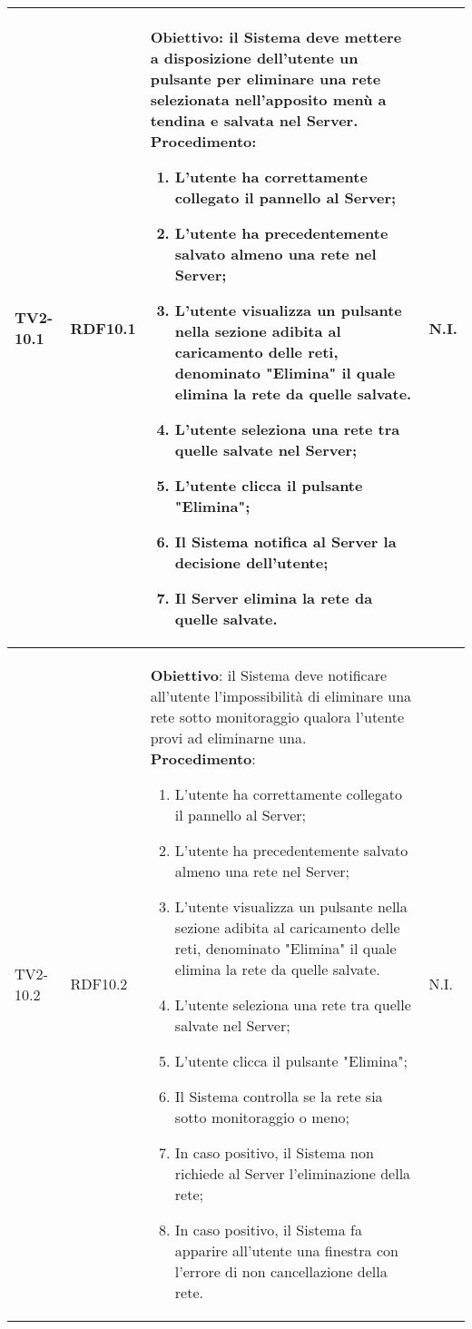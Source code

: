 \begin{longtable}{|C{.15\textwidth}|C{.13\textwidth}|m{.52\textwidth}|C{.08\textwidth}|}
TV2-10.1 & RDF10.1 &
	\textbf{Obiettivo}: il Sistema deve mettere a disposizione dell'utente un pulsante per eliminare una rete selezionata nell'apposito menù a tendina e salvata nel Server. \newline
	\textbf{Procedimento}:
	\begin{enumerate}
		\item L'utente ha correttamente collegato il pannello al Server;
		\item L'utente ha precedentemente salvato almeno una rete nel Server;
		\item L'utente visualizza un pulsante nella sezione adibita al caricamento delle reti, denominato "Elimina" il quale elimina la rete da quelle salvate.
		\item L'utente seleziona una rete tra quelle salvate nel Server;
		\item L'utente clicca il pulsante "Elimina";
		\item Il Sistema notifica al Server la decisione dell'utente;
		\item Il Server elimina la rete da quelle salvate.
	\end{enumerate}
	& N.I. \\
\hline

TV2-10.2 & RDF10.2 &
	\textbf{Obiettivo}: il Sistema deve notificare all'utente l'impossibilità di eliminare una rete sotto monitoraggio qualora l'utente provi ad eliminarne una. \newline
	\textbf{Procedimento}:
	\begin{enumerate}
		\item L'utente ha correttamente collegato il pannello al Server;
		\item L'utente ha precedentemente salvato almeno una rete nel Server;
		\item L'utente visualizza un pulsante nella sezione adibita al caricamento delle reti, denominato "Elimina" il quale elimina la rete da quelle salvate.
		\item L'utente seleziona una rete tra quelle salvate nel Server;
		\item L'utente clicca il pulsante "Elimina";
		\item Il Sistema controlla se la rete sia sotto monitoraggio o meno;
		\item In caso positivo, il Sistema non richiede al Server l'eliminazione della rete;
		\item In caso positivo, il Sistema fa apparire all'utente una finestra con l'errore di non cancellazione della rete.
	\end{enumerate}
	& N.I. \\
\hline


\end{longtable}
